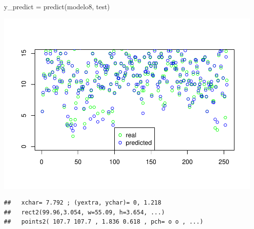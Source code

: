 \documentclass[]{article}
\newenvironment{Shaded}{\begin{snugshade}}{\end{snugshade}}
\newcommand{\DataTypeTok}[1]{\textcolor[rgb]{0.87,0.87,0.75}{#1}}
\newcommand{\DecValTok}[1]{\textcolor[rgb]{0.86,0.86,0.80}{#1}}
\newcommand{\KeywordTok}[1]{\textcolor[rgb]{0.94,0.87,0.69}{#1}}
\newcommand{\NormalTok}[1]{\textcolor[rgb]{0.80,0.80,0.80}{#1}}
\newcommand{\OperatorTok}[1]{\textcolor[rgb]{0.94,0.94,0.82}{#1}}
\newcommand{\OtherTok}[1]{\textcolor[rgb]{0.94,0.94,0.56}{#1}}
\newcommand{\StringTok}[1]{\textcolor[rgb]{0.80,0.58,0.58}{#1}}
\begin{document}
\begin{Shaded}
\begin{Highlighting}[]
\NormalTok{y_predict =}\StringTok{ }\KeywordTok{predict}\NormalTok{(modelo8, test)}
\end{Highlighting}
\end{Shaded}

\begin{Shaded}
\end{Shaded}

\includegraphics{Practica2_files/figure-latex/unnamed-chunk-52-1.pdf}

\begin{verbatim}
##   xchar= 7.792 ; (yextra, ychar)= 0, 1.218 
##   rect2(99.96,3.054, w=55.09, h=3.654, ...)
##   points2( 107.7 107.7 , 1.836 0.618 , pch= o o , ...)
\end{verbatim}
\end{document}
